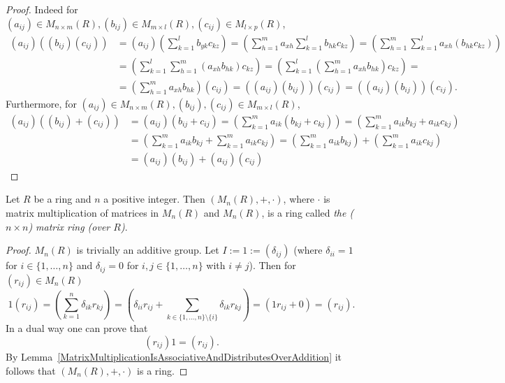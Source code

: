 \begin{proof}
    Indeed for $(a_{ij})\in M_{n\times m}(R),(b_{ij}) \in M_{m\times l}(R), (c_{ij})\in M_{l\times p}(R)$,
    \begin{align*}(a_{ij})\left((b_{ij})(c_{ij})\right) &=  (a_{ij})\left(\sum_{k=1}^l b_{yk}c_{kz}\right) = \left(\sum_{h=1}^m a_{xh}\sum_{k=1}^l b_{hk}c_{kz}\right) = \left(\sum_{h=1}^m \sum_{k=1}^l a_{xh}(b_{hk}c_{kz})\right) \\ &= \left( \sum_{k=1}^l \sum_{h=1}^m (a_{xh}b_{hk})c_{kz}\right) = \left(\sum_{k=1}^l \left(\sum_{h=1}^m a_{xh}b_{hk}\right)c_{kz}\right)  = \\
    &= \left(\sum_{h=1}^m a_{xh}b_{hk}\right) (c_{ij}) = \left((a_{ij})(b_{ij})\right)(c_{ij})  =\left((a_{ij})(b_{ij})\right)(c_{ij}). \end{align*}
    Furthermore, for $(a_{ij})\in M_{n\times m}(R),(b_{ij}), (c_{ij})\in M_{m\times l}(R)$,
    \begin{align*}
        (a_{ij})\left((b_{ij})+(c_{ij})\right) &= (a_{ij})(b_{ij}+c_{ij}) = \left(\sum_{k=1}^m a_{ik}(b_{kj}+c_{kj}) \right) = \left(\sum_{k=1}^m a_{ik}b_{kj}+a_{ik}c_{kj}\right) \\
        &= \left(\sum_{k=1}^m a_{ik}b_{kj}+ \sum_{k=1}^ma_{ik}c_{kj}\right) = \left(\sum_{k=1}^m a_{ik}b_{kj}\right)+ \left(\sum_{k=1}^ma_{ik}c_{kj}\right)
        \\ 
        &=  (a_{ij})(b_{ij}) + (a_{ij})(c_{ij})
    \end{align*}
\end{proof}
\begin{lemma}\label{MatrixRingIsRing}
    Let $R$ be a ring and $n$ a positive integer. Then $(M_n(R),+,\cdot)$, where $\cdot$ is matrix multiplication of matrices in $M_n(R)$ and $M_n(R)$, is a ring called \textit{the ($n\times n$) matrix ring (over $R$)}. 
\end{lemma}
\begin{proof}
    $M_n(R)$ is trivially an additive group. Let $I:=1:=  (\delta_{ij})$ (where $\delta_{ii}=1$ for $i\in \{1,\dots,n\}$ and $\delta_{ij} = 0$ for $i,j\in\{1,\dots,n\}$ with $i \neq j$). Then for $(r_{ij})\in M_n(R)$ 
    $$1(r_{ij}) = \left(\sum_{k=1}^n \delta_{ik}r_{kj}\right) = \left(\delta_{ii}r_{ij} +\sum_{k\in\{1,\dots,n\}\setminus\{i\}}\delta_{ik}r_{kj} \right) = (1r_{ij}+0)=(r_{ij}).$$
    In a dual way one can prove that 
    $$(r_{ij})1= (r_{ij}).$$
    By Lemma~\ref{MatrixMultiplicationIsAssociativeAndDistributesOverAddition} it follows that $(M_n(R),+,\cdot)$ is a ring.
\end{proof}
